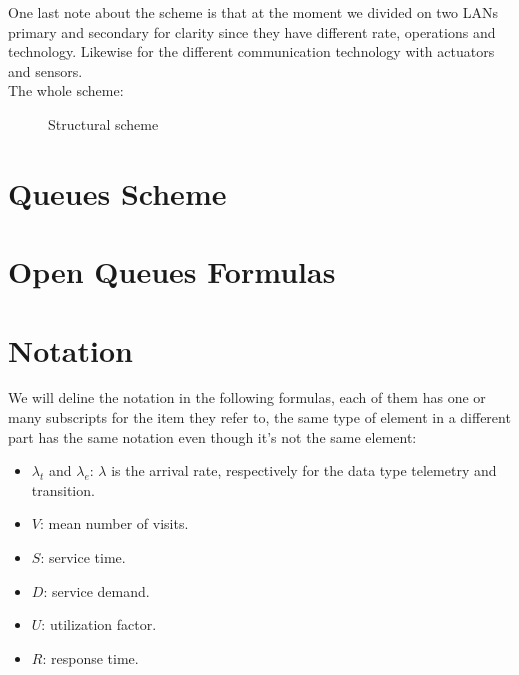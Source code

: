 \documentclass[11pt]{article}
\begin{document}
One last note about the scheme is that at the moment we divided on two LANs primary and secondary for clarity since they have different rate, operations and technology. Likewise for the different communication technology with actuators and sensors.\\
The whole scheme:
\begin{figure}[H]
  \caption{Structural scheme}
\end{figure}
\section{Queues Scheme}

\section{Open Queues Formulas}

\section{Notation}
We will deline the notation in the following formulas, each of them has one or many subscripts for the item they refer to, the same type of element in a different part has the same notation even though it's not the same element:
\begin{itemize}
\item $\lambda_t$ and $\lambda_e$: $\lambda$ is the arrival rate, respectively for the data type telemetry and transition.
\item $V$: mean number of visits.
\item $S$: service time.
\item $D$: service demand.
\item $U$: utilization factor.
\item $R$: response time.
\end{itemize}
\end{document}
